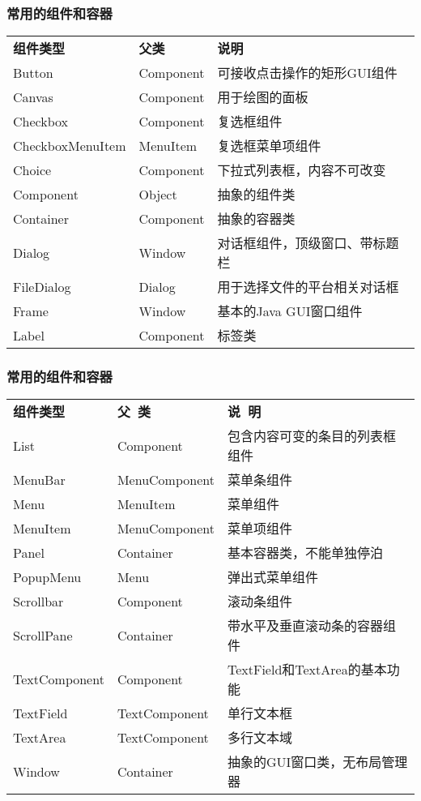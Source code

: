 \documentclass[compress,table]{beamer} %
\begin{document}
\begin{frame}[fragile] %
\frametitle{常用的组件和容器 }

\begin{table}
\scriptsize
\setlength{\extrarowheight}{1.2mm}
\begin{tabular}{lll}
{\bf 组件类型} & {\bf 父类}  & {\bf 说明}\\
Button & Component & 可接收点击操作的矩形GUI组件\\
Canvas & Component & 用于绘图的面板\\
Checkbox & Component & 复选框组件\\
CheckboxMenuItem & MenuItem & 复选框菜单项组件\\
Choice & Component & 下拉式列表框，内容不可改变\\
Component & Object & 抽象的组件类\\
Container & Component & 抽象的容器类\\
Dialog & Window & 对话框组件，顶级窗口、带标题栏\\
FileDialog & Dialog & 用于选择文件的平台相关对话框\\
Frame & Window & 基本的Java GUI窗口组件\\
Label & Component & 标签类\\
\end{tabular}
\end{table}
\end{frame}

\begin{frame}[fragile] %
\frametitle{常用的组件和容器 }

\begin{table}
\scriptsize
\setlength{\extrarowheight}{1.2mm}
\begin{tabular}{lll}
{\bf 组件类型} & {\bf 父~类}  & {\bf 说~明}\\
List & Component & 包含内容可变的条目的列表框组件\\
MenuBar & MenuComponent & 菜单条组件\\
Menu & MenuItem & 菜单组件\\
MenuItem & MenuComponent & 菜单项组件\\
Panel & Container & 基本容器类，不能单独停泊\\
PopupMenu & Menu & 弹出式菜单组件\\
Scrollbar & Component & 滚动条组件\\
ScrollPane & Container & 带水平及垂直滚动条的容器组件\\
TextComponent & Component & TextField和TextArea的基本功能\\
TextField & TextComponent & 单行文本框\\
TextArea & TextComponent & 多行文本域\\
Window & Container & 抽象的GUI窗口类，无布局管理器\\
\end{tabular}
\end{table}
\end{frame}
\end{document}

